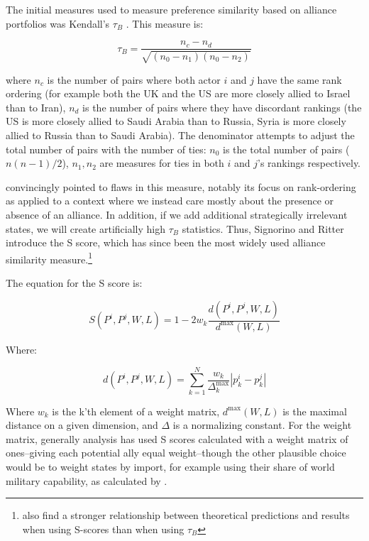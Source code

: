  The initial measures used to measure preference similarity based on alliance portfolios was Kendall's $\tau_{B}$ \citet{buenodemesquita:lalman:2008}. This measure is:
 
 \begin{equation}
	 \tau_{B} = \frac{n_{c} - n_{d}}{\sqrt{(n_{0} - n_{1})(n_{0} - n_{2})}}
 \end{equation}
 
 where $n_{c}$ is the number of pairs where both actor $i$ and $j$ have the same rank ordering (for example both the UK and the US are more closely allied to Israel than to Iran), $n_{d}$ is the number of pairs where they have discordant rankings (the US is more closely allied to Saudi Arabia than to Russia, Syria is more closely allied to Russia than to Saudi Arabia). The denominator attempts to adjust the total number of pairs with the number of ties: $n_{0}$ is the total number of pairs ($n(n-1)/2$), $n_{1}, n_{2}$ are measures for ties in both $i$ and $j$'s rankings respectively.
 
\citet{signorino:ritter:1999} convincingly pointed to flaws in this measure, notably its focus on rank-ordering as applied to a context where we instead care mostly about the presence or absence of an alliance. In addition, if we add additional strategically irrelevant states, we will create artificially high $\tau_{B}$ statistics. Thus, Signorino and Ritter introduce the S score, which has since been the most widely used alliance similarity measure.\footnote{\citep{bennett:rupert:2003} also find a stronger relationship between theoretical predictions and results when using S-scores than when using $\tau_{B}$}

The equation for the S score is:

\begin{equation}
	S(P^i, P^j, W, L) = 1 - 2w_k \frac{d(P^i, P^j, W, L)}{d^{\text{max}}(W,L)}
\end{equation}

Where:

\begin{equation}
	d(P^i, P^j, W, L) = \sum_{k = 1}^N \frac{w_k}{\Delta^\text{max}_{k}} |p^i_k - p^j_k|
\end{equation}

Where $w_k$ is the k'th element of a weight matrix, $d^\text{max}(W,L)$ is the maximal distance on a given dimension, and $\Delta$ is a normalizing constant. For the weight matrix, generally analysis has used S scores calculated with a weight matrix of ones--giving each potential ally equal weight--though the other plausible choice would be to weight states by import, for example using their share of world military capability, as calculated by \citet{singer:small:1995}.

